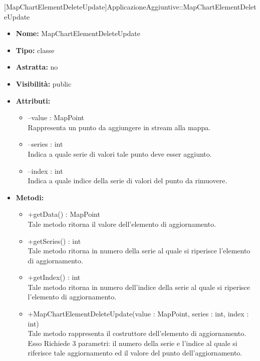 			[MapChartElementDeleteUpdate]{ApplicazioneAggiuntive::MapChartElementDeleteUpdate}
			

	
			
			\begin{itemize}
			\item \textbf{Nome:} MapChartElementDeleteUpdate
			\item \textbf{Tipo:} classe
			
		\item \textbf{Astratta:}
		no
			\item \textbf{Visibilità:} public
			\item \textbf{Attributi:}
				\begin{itemize}
				\setlength{\itemsep}{5pt}
				
					\item[\ding{111}] {--value : MapPoint} \\ [1mm] Rappresenta un punto da aggiungere in stream alla mappa.
					\item[\ding{111}] {--series : int} \\ [1mm] Indica a quale serie di valori tale punto deve esser aggiunto.
					\item[\ding{111}] {--index : int} \\ [1mm] Indica a quale indice della serie di valori del punto da rimuovere.
				\end{itemize}
		
			\item \textbf{Metodi:}
				\begin{itemize}
				\setlength{\itemsep}{5pt}
				
					\item[\ding{111}] {{+getData() : MapPoint}} \\ [1mm] Tale metodo ritorna il valore dell'elemento di aggiornamento.
					\item[\ding{111}] {{+getSeries() : int}} \\ [1mm] Tale metodo ritorna in numero della serie al quale si riperisce l'elemento di aggiornamento.
					\item[\ding{111}] {{+getIndex() : int}} \\ [1mm] Tale metodo ritorna in numero dell'indice della serie al quale si riperisce l'elemento di aggiornamento.
					\item[\ding{111}] {{+MapChartElementDeleteUpdate(value : MapPoint, series : int, index : int)}} \\ [1mm] Tale metodo rappresenta il costruttore dell'elemento di aggiornamento. Esso Richiede 3 parametri: il numero della serie e l'indice al quale si riferisce tale aggiornamento ed il valore del punto dell'aggiornamento.
				\end{itemize}
		
			\end{itemize}
	
